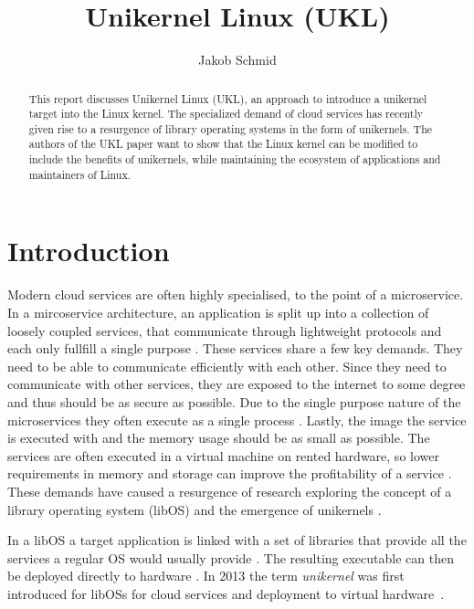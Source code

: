 \documentclass[10pt,twocolumn,a4paper]{article}
\author{Jakob Schmid}
\begin{document}
\title{Unikernel Linux (UKL)}

\newcommand{\todo}[1]{{\texttt{[#1]}}}
\newcommand{\code}[1]{{\tt \small{#1}}}
\newcommand{\refsec}[1]{{§~\ref{#1}}}

\maketitle

\begin{abstract}
  This report discusses Unikernel Linux (UKL), an approach to introduce a
  unikernel target into the Linux kernel.
  The specialized demand of cloud services has recently given rise
  to a resurgence of library operating systems in the form of unikernels.
  The authors of the UKL paper want to show that the Linux kernel can be
  modified to include the benefits of unikernels, while maintaining the
  ecosystem of applications and maintainers of Linux.
\end{abstract}

\section{Introduction}\label{sec:introduction}
  Modern cloud services are often highly specialised, to the point of a microservice.
  In a mircoservice architecture, an application is split up into a collection of loosely coupled services,
  that communicate through lightweight protocols and each only fullfill a single purpose \cite{madhavapeddy13-2}.
  These services share a few key demands. They need to be able to communicate 
  efficiently with each other. Since they need to communicate with other services,
  they are exposed to the internet to some degree and thus should be as secure as possible.
  Due to the single purpose nature of the microservices they often execute as a single process \cite{raza19}.
  Lastly, the image the service is executed with and the memory usage should be as small as possible.
  The services are often executed in a virtual machine on rented hardware, so lower requirements
  in memory and storage can improve the profitability of a service \cite{madhavapeddy13}.
  These demands have caused a resurgence of research exploring the concept of 
  a library operating system (libOS) and the emergence of unikernels \cite{madhavapeddy13-2}. 

  In a libOS a target application is linked with a set of
  libraries that provide all the services a regular OS would usually provide \cite{madhavapeddy13-2}.
  The resulting executable can then be deployed directly to hardware \cite{raza19}.
  In 2013 the term \textit{unikernel} was first introduced for libOSs
  for cloud services and deployment to virtual hardware~\cite{madhavapeddy13}.
\end{document}
